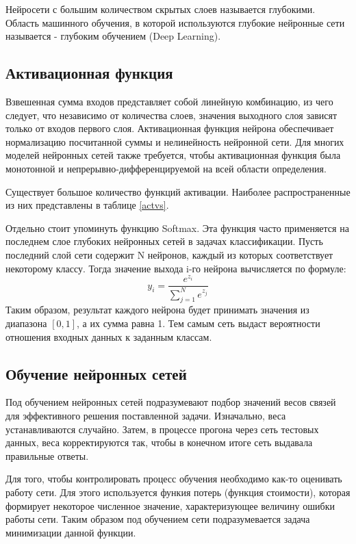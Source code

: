 Нейросети с большим количеством скрытых слоев называется глубокими. Область машинного обучения, в которой используются глубокие нейронные сети называется - глубоким обучением (Deep Learning).     

\subsection{Активационная функция}
\label{sec:activation}
Взвешенная сумма входов представляет собой линейную комбинацию, из чего следует, что независимо от количества слоев, значения выходного слоя зависят только от входов первого слоя. 
Активационная функция нейрона обеспечивает нормализацию посчитанной суммы и нелинейность нейронной сети. Для многих моделей нейронных сетей также требуется, чтобы активационная функция была монотонной и непрерывно-дифференцируемой на всей области определения.

Существует большое количество функций активации. Наиболее распространенные из них представлены в таблице \ref{actvs}.



Отдельно стоит упоминуть функцию Softmax. Эта функция часто применяется на последнем слое глубоких нейронных сетей в задачах классификации. Пусть последний слой сети содержит N нейронов, каждый из которых соответствует некоторому классу. Тогда значение выхода i-го нейрона вычисляется по формуле: 
\[
    y_i=\frac{e^{z_i}}{\sum_{j=1}^{N}e^{z_j}}
\]
Таким образом, результат каждого нейрона будет принимать значения из диапазона $[0,1]$, а их сумма равна 1. Тем самым сеть выдаст вероятности отношения входных данных к заданным классам.

\subsection{Обучение нейронных сетей}
Под обучением нейронных сетей подразумевают подбор значений весов связей для эффективного решения поставленной задачи. Изначально, веса устанавливаются случайно. Затем, в процессе прогона через сеть тестовых данных, веса корректируются так, чтобы в конечном итоге сеть выдавала правильные ответы. 

Для того, чтобы контролировать процесс обучения необходимо как-то оценивать работу сети. Для этого используется функия потерь (функция стоимости), которая формирует некоторое численное значение, характеризующее величину ошибки работы сети. Таким образом под обучением сети подразумевается задача минимизации данной функции.

